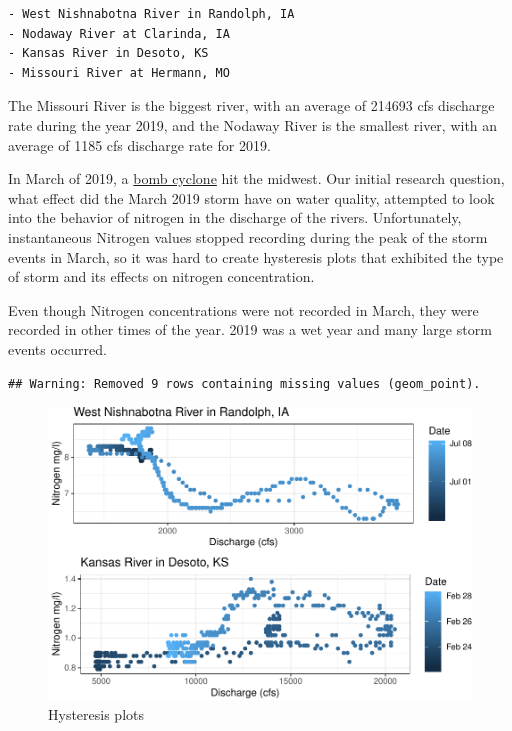 \documentclass[12pt,]{article}
\begin{document}
\begin{verbatim}
- West Nishnabotna River in Randolph, IA
- Nodaway River at Clarinda, IA
- Kansas River in Desoto, KS
- Missouri River at Hermann, MO
\end{verbatim}

The Missouri River is the biggest river, with an average of 214693 cfs
discharge rate during the year 2019, and the Nodaway River is the
smallest river, with an average of 1185 cfs discharge rate for 2019.

In March of 2019, a
\href{https://www.kansascity.com/news/state/missouri/article228237519.html}{bomb
cyclone} hit the midwest. Our initial research question, what effect did
the March 2019 storm have on water quality, attempted to look into the
behavior of nitrogen in the discharge of the rivers. Unfortunately,
instantaneous Nitrogen values stopped recording during the peak of the
storm events in March, so it was hard to create hysteresis plots that
exhibited the type of storm and its effects on nitrogen concentration.

Even though Nitrogen concentrations were not recorded in March, they
were recorded in other times of the year. 2019 was a wet year and many
large storm events occurred.

\begin{verbatim}
## Warning: Removed 9 rows containing missing values (geom_point).
\end{verbatim}

\begin{figure}
\centering
\includegraphics{Project_Template_files/figure-latex/desotos-1.pdf}
\caption{\label{fig:desotos} Hysteresis plots}
\end{figure}
\end{document}
